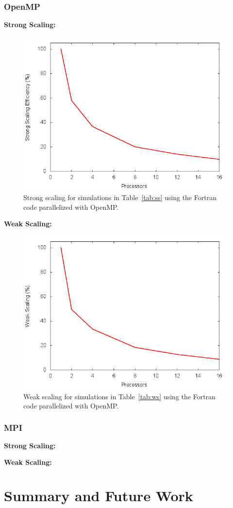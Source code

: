 \documentclass{scrartcl}
\begin{document}
  \subsubsection{OpenMP}
  \textbf{Strong Scaling:}
  \begin{figure}
  	\begin{center}
	  	\includegraphics[width=0.7\columnwidth]{./fort_scaling/ss.png}
	  	\caption{Strong scaling for simulations in Table~\ref{tab:ss} using the Fortran code parallelized with OpenMP.}
		\label{fig:ss_fort_omp}
  	\end{center}
  \end{figure}
  
  
  \textbf{Weak Scaling:}  
    \begin{figure}
    	\begin{center}
    		\includegraphics[width=0.7\columnwidth]{./fort_scaling/ws.png}
    		\caption{Weak scaling for simulations in Table~\ref{tab:ws} using the Fortran code parallelized with OpenMP.}
    		\label{fig:ws_fort_omp}
    	\end{center}
    \end{figure}
  
  \subsubsection{MPI}
  \textbf{Strong Scaling:}
  
  \textbf{Weak Scaling:}
  
    \section{Summary and Future Work}
\end{document}
